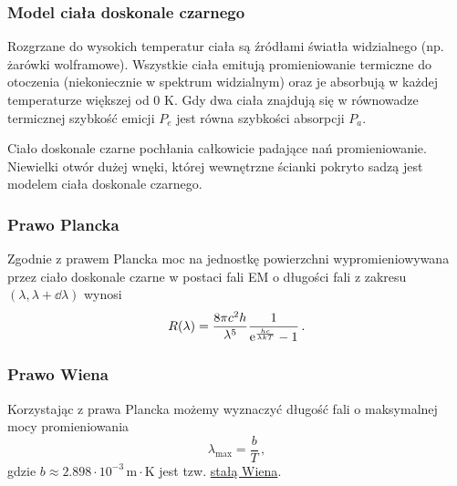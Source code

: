 \documentclass[../main.tex]{subfiles}
\begin{document}
\subsubsection*{Model ciała doskonale czarnego}
Rozgrzane do wysokich temperatur ciała są źródłami światła widzialnego (np. żarówki wolframowe). Wszystkie ciała emitują promieniowanie termiczne do otoczenia (niekoniecznie w spektrum widzialnym) oraz je absorbują w każdej temperaturze większej od 0 K. Gdy dwa ciała znajdują się w równowadze termicznej szybkość emicji \(P_e\) jest równa szybkości absorpcji \(P_a\).
\medskip

Ciało doskonale czarne pochłania całkowicie padające nań promieniowanie. Niewielki otwór dużej wnęki, której wewnętrzne ścianki pokryto sadzą jest modelem ciała doskonale czarnego.
\medskip

\noindent{}

\subsubsection*{Prawo Plancka}
Zgodnie z prawem Plancka moc na jednostkę powierzchni wypromieniowywana przez ciało doskonale czarne w postaci fali EM o długości fali z zakresu \((\lambda, \lambda+\dd{\lambda})\) wynosi
\begin{equation*}
    R(\lambda)=\frac{8\pi c^2h}{\lambda^5}\frac{1}{\mathrm{e}^{\frac{hc}{\lambda kT}}-1}\,.
\end{equation*}
\subsubsection*{Prawo Wiena}
Korzystając z prawa Plancka możemy wyznaczyć długość fali o maksymalnej mocy promieniowania
\begin{equation*}
    \lambda_\text{max}=\frac{b}{T}\,,
\end{equation*}
gdzie \(b\approx2.898\cdot10^{-3}\,\text{m}\cdot\text{K}\) jest tzw. \underline{stałą Wiena}.
\end{document}

